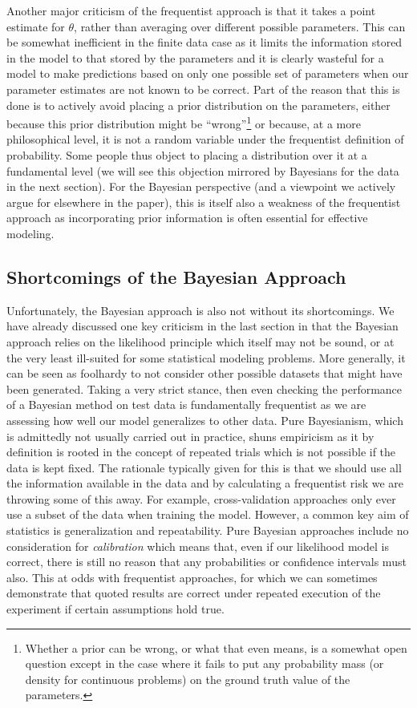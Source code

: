 Another major criticism of the frequentist approach is that it takes a point estimate for $\theta$, rather than averaging
over different possible parameters.  This can be somewhat inefficient in the finite data case as it limits the information
stored in the model to that stored by the parameters and it is clearly wasteful for a model to make predictions based on
only one possible set of parameters when our parameter estimates are not known to be correct.  Part of the reason that this
is done is to actively avoid placing a prior distribution on the parameters, either because this prior distribution might
be ``wrong''\footnote{Whether a prior can be wrong, or what that even means, is a somewhat open question except in the
	case where it fails to put any probability mass (or density for continuous problems) on the ground truth value of
	the parameters.} or because, at a more philosophical level, it is not a random variable under the frequentist definition
of probability.  Some people thus object to placing a distribution over it at a fundamental level (we will see this objection
mirrored by Bayesians for the data in the next section).  For the Bayesian perspective (and a viewpoint we actively 
argue for elsewhere in the paper), this is itself also a weakness of the frequentist approach as incorporating prior
information is often essential for effective modeling.


\subsection{Shortcomings of the Bayesian Approach}
\label{sec:bayes:religion:bayes}

Unfortunately, the Bayesian approach is also not without its shortcomings.  We have already discussed one
key criticism in the last section in that the Bayesian approach relies on the likelihood principle which itself may not
be sound, or at the very least ill-suited for some statistical modeling problems.  More generally, it can be seen as
foolhardy to not consider other possible datasets that might have been generated.  Taking a very strict stance, then
even checking the performance of a Bayesian method on test data is fundamentally frequentist as we are assessing how
well our model generalizes to other data.  Pure Bayesianism, which is admittedly not usually carried out in practice, shuns
empiricism as it by definition is rooted in the concept of repeated trials which is not possible if the data is kept fixed.
The rationale typically given for
this is that we should use all the information available in the data and by calculating a frequentist risk we are throwing
some of this away.  For example, cross-validation approaches only ever use a subset of the data when training the model.
However, a common key aim of statistics is generalization and repeatability.  Pure Bayesian approaches include no
consideration for \emph{calibration} which means that, even if our likelihood model is correct, there is still no reason
that any probabilities or confidence intervals must also.  This at odds with frequentist approaches, for which
we can sometimes demonstrate that quoted results are correct under repeated execution of the experiment if certain assumptions
hold true.

